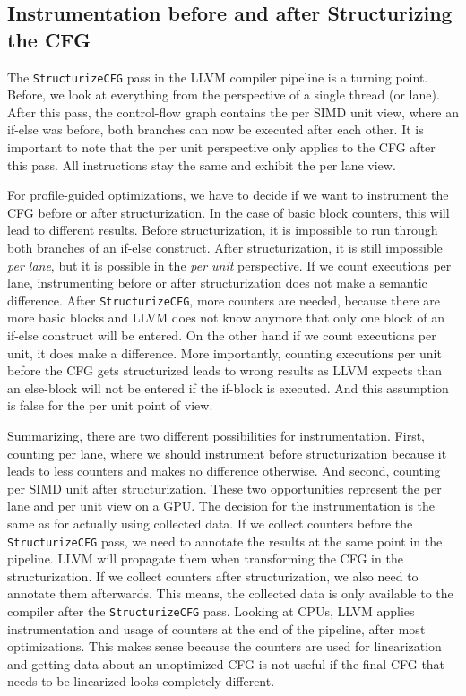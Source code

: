 \clearpage
{}
\label{sec:discussion}

\subsection{Instrumentation before and after Structurizing the CFG}
\label{sub:discussion_structurize}
The \texttt{StructurizeCFG} pass in the LLVM compiler pipeline is a turning point. Before, we look at everything from the perspective of a single thread (or lane).
After this pass, the control-flow graph contains the per SIMD unit view, where an if-else was before, both branches can now be executed after each other.
It is important to note that the per unit perspective only applies to the CFG after this pass. All instructions stay the same and exhibit the per lane view.

For profile-guided optimizations, we have to decide if we want to instrument the CFG before or after structurization. In the case of basic block counters, this will lead to different results.
Before structurization, it is impossible to run through both branches of an if-else construct. After structurization, it is still impossible \emph{per lane}, but it is possible in the \emph{per unit} perspective.
If we count executions per lane, instrumenting before or after structurization does not make a semantic difference.
After \texttt{StructurizeCFG}, more counters are needed, because there are more basic blocks and LLVM does not know anymore that only one block of an if-else construct will be entered.
On the other hand if we count executions per unit, it does make a difference. More importantly, counting executions per unit before the CFG gets structurized leads to wrong results as LLVM expects than an else-block will not be entered if the if-block is executed. And this assumption is false for the per unit point of view.

Summarizing, there are two different possibilities for instrumentation. First, counting per lane, where we should instrument before structurization because it leads to less counters and makes no difference otherwise.
And second, counting per SIMD unit after structurization. These two opportunities represent the per lane and per unit view on a GPU.
The decision for the instrumentation is the same as for actually using collected data. If we collect counters before the \texttt{StructurizeCFG} pass, we need to annotate the results at the same point in the pipeline.
LLVM will propagate them when transforming the CFG in the structurization.
If we collect counters after structurization, we also need to annotate them afterwards. This means, the collected data is only available to the compiler after the \texttt{StructurizeCFG} pass.
Looking at CPUs, LLVM applies instrumentation and usage of counters at the end of the pipeline, after most optimizations.
This makes sense because the counters are used for linearization and getting data about an unoptimized CFG is not useful if the final CFG that needs to be linearized looks completely different.

